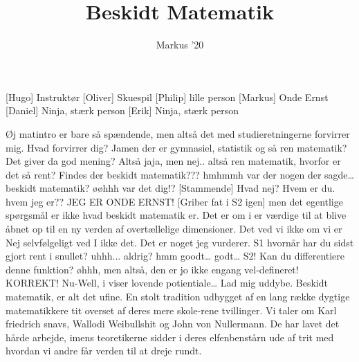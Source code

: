 \documentclass[a4paper,11pt]{article}
\title{Beskidt Matematik}
\author{Markus '20}
\begin{document}
\maketitle

\begin{roles}
[Hugo] Instruktør
[Oliver] Skuespil
[Philip] lille person
[Markus] Onde Ernst
[Daniel] Ninja, stærk person
[Erik] Ninja, stærk person
\end{roles}

\begin{sketch}
 Øj matintro er bare så spændende, men altså det med studieretningerne forvirrer mig.
 Hvad forvirrer dig?
Jamen der er gymnasiel, statistik og så ren matematik?
 Det giver da god mening?
 Altså jaja, men nej.. altså ren matematik, hvorfor er det så rent? Findes der beskidt matematik???
 hmhmmh var der nogen der sagde… beskidt matematik?
 øøhhh
 var det dig!?
 
[Stammende] Hvad nej? Hvem er du.
 hvem jeg er?? 
 JEG ER ONDE ERNST!
[Griber fat i S2 igen] men det egentlige spørgsmål er ikke hvad beskidt matematik er. Det er om i er værdige til at blive åbnet op til en ny verden af overtællelige dimensioner.
 
 
 Det ved vi ikke om vi er
 Nej selvfølgeligt ved I ikke det. Det er noget jeg vurderer.
 S1 hvornår har du sidst gjort rent i snullet?
 uhhh... aldrig?
 hmm goodt… godt… S2! Kan du differentiere denne funktion? 
 øhhh, men altså, den er jo ikke engang vel-defineret!
 KORREKT!
 Nu-Well, i viser lovende potientiale… Lad mig uddybe. Beskidt matematik, er alt det ufine. En stolt tradition udbygget af en lang række dygtige matematikkere tit overset af deres mere skole-rene tvillinger. Vi taler om Karl friedrich snavs, Wallodi Weibullshit og John von Nullermann. De har lavet det hårde arbejde, imens teoretikerne sidder i deres elfenbenstårn ude af trit med hvordan vi andre får verden til at dreje rundt.

\end{sketch}
\end{document}
